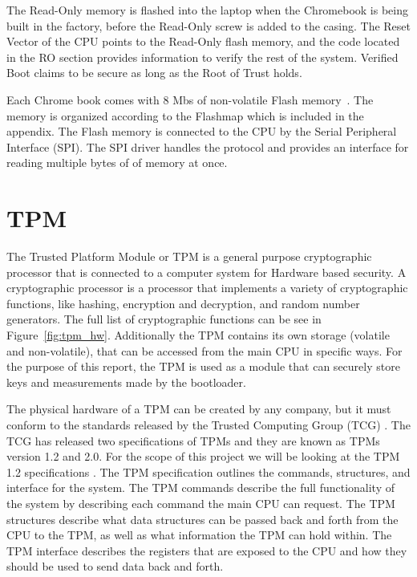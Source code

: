 The Read-Only memory is flashed into the laptop when the Chromebook is being built in the factory, before the Read-Only screw is added to the casing. 
The Reset Vector of the CPU points to the Read-Only flash memory, and the code located in the RO section provides information to verify the rest of the system.
Verified Boot claims to be secure as long as the Root of Trust holds.

Each Chrome book comes with 8 Mbs of non-volatile Flash memory~\cite{fw-summit}.
The memory is organized according to the Flashmap which is included in the appendix.
The Flash memory is connected to the CPU by the Serial Peripheral Interface (SPI).
The SPI driver handles the protocol and provides an interface for reading multiple bytes of of memory at once.

\section{TPM}\label{sec:TPM}

The Trusted Platform Module or TPM is a general purpose cryptographic processor that is connected to a computer system for Hardware based security\cite{TPM}.
A cryptographic processor is a processor that implements a variety of
cryptographic functions, like hashing, encryption and decryption, and random
number generators. The full list of cryptographic functions can be see in
Figure~\ref{fig:tpm_hw}.
Additionally the TPM contains its own storage (volatile and non-volatile), that can be accessed from the main CPU in specific ways.
For the purpose of this report, the TPM is used as a module that can securely store keys and measurements made by the bootloader.

The physical hardware of a TPM can be created by any company, but it must conform to the standards released by the Trusted Computing Group (TCG) \cite{TCG}.
The TCG has released two specifications of TPMs and they are known as TPMs version 1.2 and 2.0.
For the scope of this project we will be looking at the TPM 1.2 specifications \cite{TPM-design}\cite{TPM-struct}\cite{TPM-cmd}.
The TPM specification outlines the commands, structures, and interface for the system.
The TPM commands describe the full functionality of the system by describing each command the main CPU can request.
The TPM structures describe what data structures can be passed back and forth from the CPU to the TPM, as well as what information the TPM can hold within.
The TPM interface describes the registers that are exposed to the CPU and how they should be used to send data back and forth.

